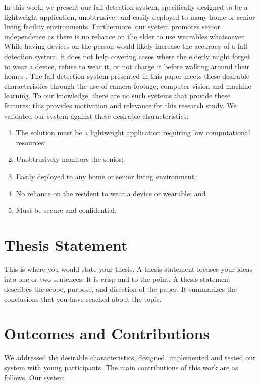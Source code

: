 In this work, we present our fall detection system, specifically designed to be a lightweight application, unobtrusive, and easily deployed to many home or senior living facility environments. Furthermore, our system promotes senior independence as there is no reliance on the elder to use wearables whatsoever. While having devices on the person would likely increase the accuracy of a fall detection system, it does not help covering cases where the elderly might forget to wear a device, refuse to wear it, or not charge it before walking around their homes \cite{RN999}. The fall detection system presented in this paper meets these desirable characteristics through the use of camera footage, computer vision and machine learning. To our knowledge, there are no such systems that provide these features; this provides motivation and relevance for this research study. We validated our system against these desirable characteristics:


\begin{enumerate}
    \item The solution must be a lightweight application requiring low computational resources;
    \item Unobtrusively monitors the senior;
    \item Easily deployed to any home or senior living environment;
    \item No reliance on the resident to wear a device or wearable; and
    \item Must be secure and confidential.
\end{enumerate}


\section{Thesis Statement}
This is where you would state your thesis.  A thesis statement focuses your ideas into one or two sentences. It is crisp and to the point. 
A thesis statement describes the scope, purpose, and direction of the paper. It summarizes the conclusions that you have reached about the topic. 

\section{Outcomes and Contributions}
We addressed the desirable characteristics, designed, implemented and tested our system with young participants. The main contributions of this work are as follows.  Our system

